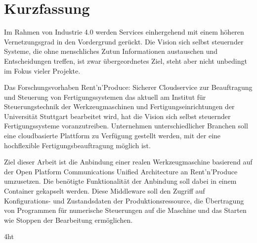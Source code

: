 \documentclass[
a4paper,
twoside,
bibliography=totoc,
headsepline,
cleardoublepage=empty,
parskip=half,
draft=false
]{scrbook}
\begin{document}
	\newpage
	
	\section*{Kurzfassung}
	
		Im Rahmen von Industrie 4.0 werden Services einhergehend mit einem höheren Vernetzungsgrad in den Vordergrund gerückt. 
		Die Vision sich selbst steuernder Systeme, die ohne menschliches Zutun Informationen austauschen und Entscheidungen treffen, ist zwar übergeordnetes Ziel, steht aber nicht unbedingt im Fokus vieler Projekte.
		
		Das Forschungsvorhaben \glqq Rent'n'Produce: Sicherer Cloudservice zur Beauftragung und Steuerung von Fertigungssystemen\grqq{} das aktuell am Institut für Steuerungstechnik der Werkzeugmaschinen und Fertigungseinrichtungen der Universität Stuttgart bearbeitet wird, hat die Vision sich selbst steuernder Fertigungssysteme voranzutreiben.
		Unternehmen unterschiedlicher Branchen soll eine cloudbasierte Plattform zu Verfügung gestellt werden, mit der eine hochflexible Fertigungsbeauftragung möglich ist.
		
		Ziel dieser Arbeit ist die Anbindung einer realen Werkzeugmaschine basierend auf der Open Platform Communications Unified Architecture an Rent'n'Produce umzusetzen. 
		Die benötigte Funktionalität der Anbindung soll dabei in einem Container gekapselt werden. 
		Diese Middleware soll den Zugriff auf Konfigurations- und Zustandsdaten der Produktionsressource, die Übertragung von Programmen für numerische Steuerungen auf die Maschine und das Starten wie Stoppen der Bearbeitung ermöglichen.
	
	\cleardoublepage
	
	
	\iftex4ht
	\else
	\fi
	
	
	\tableofcontents
	
	
\end{document}
